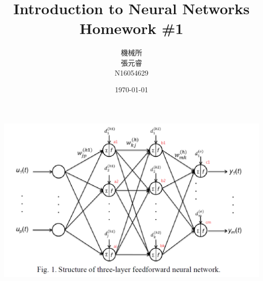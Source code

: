 \documentclass[12pt,a4paper]{article}
\title{Introduction to Neural Networks \\ Homework \#1}
\author{機械所 \\張元睿 \\N16054629}
\date{\today}
\begin{document}
	\begin{CJK}{UTF8}{bsmi}
	\maketitle
	\newpage
\includegraphics[scale=0.5]{hw1}


\end{CJK}
\end{document}
